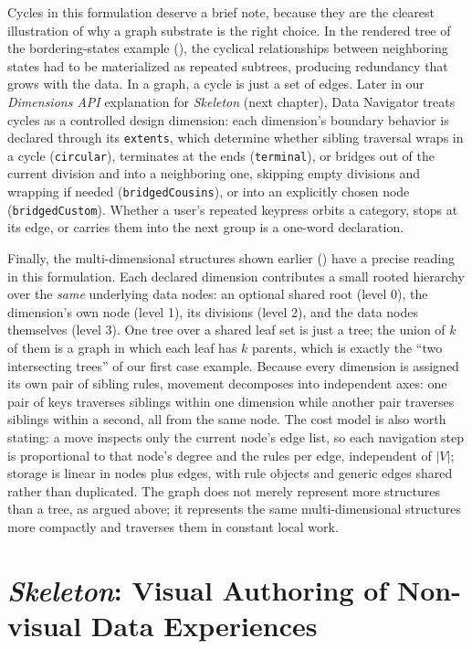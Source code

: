 \documentclass[12pt]{cmuthesis}
\begin{document}
Cycles in this formulation deserve a brief note, because they are the clearest illustration of why a graph substrate is the right choice. In the rendered tree of the bordering-states example (), the cyclical relationships between neighboring states had to be materialized as repeated subtrees, producing redundancy that grows with the data. In a graph, a cycle is just a set of edges. Later in our \textit{Dimensions API} explanation for \textit{Skeleton} (next chapter), Data Navigator treats cycles as a controlled design dimension: each dimension's boundary behavior is declared through its \texttt{extents}, which determine whether sibling traversal wraps in a cycle (\texttt{circular}), terminates at the ends (\texttt{terminal}), or bridges out of the current division and into a neighboring one, skipping empty divisions and wrapping if needed (\texttt{bridgedCousins}), or into an explicitly chosen node (\texttt{bridgedCustom}). Whether a user's repeated keypress orbits a category, stops at its edge, or carries them into the next group is a one-word declaration.

Finally, the multi-dimensional structures shown earlier () have a precise reading in this formulation. Each declared dimension contributes a small rooted hierarchy over the \textit{same} underlying data nodes: an optional shared root (level 0), the dimension's own node (level 1), its divisions (level 2), and the data nodes themselves (level 3). One tree over a shared leaf set is just a tree; the union of $k$ of them is a graph in which each leaf has $k$ parents, which is exactly the ``two intersecting trees'' of our first case example. Because every dimension is assigned its own pair of sibling rules, movement decomposes into independent axes: one pair of keys traverses siblings within one dimension while another pair traverses siblings within a second, all from the same node. The cost model is also worth stating: a move inspects only the current node's edge list, so each navigation step is proportional to that node's degree and the rules per edge, independent of $|V|$; storage is linear in nodes plus edges, with rule objects and generic edges shared rather than duplicated. The graph does not merely represent more structures than a tree, as argued above; it represents the same multi-dimensional structures more compactly and traverses them in constant local work.

\chapter{\textit{Skeleton}: Visual Authoring of Non-visual Data Experiences}
\end{document}
